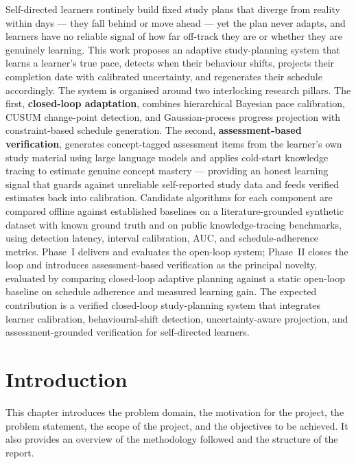 \documentclass[12pt]{report}
\begin{document}
Self-directed learners routinely build fixed study plans that diverge from reality within days --- they fall behind or move ahead --- yet the plan never adapts, and learners have no reliable signal of how far off-track they are or whether they are genuinely learning. This work proposes an adaptive study-planning system that learns a learner's true pace, detects when their behaviour shifts, projects their completion date with calibrated uncertainty, and regenerates their schedule accordingly. The system is organised around two interlocking research pillars. The first, \textbf{closed-loop adaptation}, combines hierarchical Bayesian pace calibration, CUSUM change-point detection, and Gaussian-process progress projection with constraint-based schedule generation. The second, \textbf{assessment-based verification}, generates concept-tagged assessment items from the learner's own study material using large language models and applies cold-start knowledge tracing to estimate genuine concept mastery --- providing an honest learning signal that guards against unreliable self-reported study data and feeds verified estimates back into calibration. Candidate algorithms for each component are compared offline against established baselines on a literature-grounded synthetic dataset with known ground truth and on public knowledge-tracing benchmarks, using detection latency, interval calibration, AUC, and schedule-adherence metrics. Phase~I delivers and evaluates the open-loop system; Phase~II closes the loop and introduces assessment-based verification as the principal novelty, evaluated by comparing closed-loop adaptive planning against a static open-loop baseline on schedule adherence and measured learning gain. The expected contribution is a verified closed-loop study-planning system that integrates learner calibration, behavioural-shift detection, uncertainty-aware projection, and assessment-grounded verification for self-directed learners.

\newpage

\tableofcontents
\newpage
\listoffigures
\newpage
\listoftables
\newpage

\chapter{Introduction}

This chapter introduces the problem domain, the motivation for the project, the problem statement, the scope of the project, and the objectives to be achieved. It also provides an overview of the methodology followed and the structure of the report.
\end{document}
